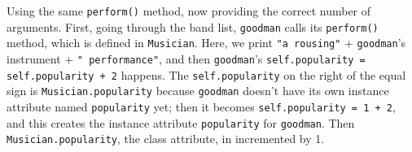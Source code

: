 \begin{blocksection}
\begin{solution}[.2in]
Using the same \lstinline{perform()} method, now providing the correct number of arguments. First, going through the band list, \lstinline{goodman} calls its \lstinline{perform()} method, which is defined in \lstinline{Musician}. Here, we print \lstinline{"a rousing"} + \lstinline{goodman}'s instrument + \lstinline{" performance"}, and then \lstinline{goodman}'s \lstinline{self.popularity = self.popularity + 2} happens. The \lstinline{self.popularity} on the right of the equal sign is \lstinline{Musician.popularity} because \lstinline{goodman} doesn't have its own instance attribute named \lstinline{popularity} yet; then it becomes \lstinline{self.popularity = 1 + 2}, and this creates the instance attribute \lstinline{popularity} for \lstinline{goodman}. Then \lstinline{Musician.popularity}, the class attribute, in incremented by 1.
\end{solution}
\end{blocksection}

\vspace{2\baselineskip}


